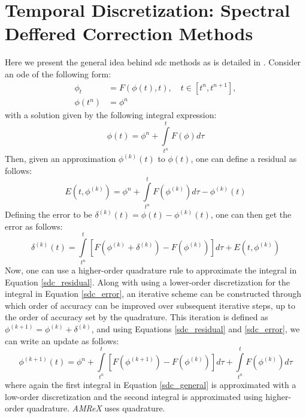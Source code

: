 \section{Temporal Discretization: Spectral Deffered Correction Methods}
Here we present the general idea behind \gls{sdc} methods as is detailed in \cite{MISDC_general}. Consider an \gls{ode} of the following form: 
\begin{equation} \label{toy_ode}
\begin{split}
\phi_t &= F(\phi(t), t), \quad t \in [t^n, t^{n+1}], \\
\phi(t^n) &= \phi^n 
\end{split}
\end{equation}
with a solution given by the following integral expression:
\begin{equation}
\phi(t) = \phi^n + \int\limits_{t^n}^{t} F(\phi) d\tau
\end{equation}
Then, given an approximation $\phi^{(k)}(t)$ to $\phi(t)$, one can define a residual as follows:
\begin{equation} \label{sdc_residual}
E(t, \phi^{(k)}) = \phi^n + \int\limits_{t^n}^t  F(\phi^{(k)}) d\tau - \phi^{(k)}(t)
\end{equation}
Defining the error to be $\delta^{(k)}(t) = \phi(t) - \phi^{(k)}(t)$, one can then get the error as follows:
\begin{equation} \label{sdc_error}
\delta^{(k)}(t) = \int\limits_{t^n}^{t} \left[ F(\phi^{(k)} + \delta^{(k)}) - F(\phi^{(k)}) \right] d\tau + E(t, \phi^{(k)})
\end{equation}
Now, one can use a higher-order quadrature rule to approximate the integral in Equation \eqref{sdc_residual}. Along with using a lower-order discretization for the integral in Equation \eqref{sdc_error}, an iterative scheme can be constructed through which order of accuracy can be improved over subsequent iterative steps, up to the order of accuracy set by the quadrature. This iteration is defined as $\phi^{(k+1)} = \phi^{(k)} + \delta^{(k)}$, and using Equations \eqref{sdc_residual} and \eqref{sdc_error}, we can write an update as follows:
\begin{equation} \label{sdc_general}
\phi^{(k+1)}(t) = \phi^n + \int\limits_{t^n}^{t} \left[ F(\phi^{(k+1)}) - F(\phi^{(k)}) \right] d\tau + \int\limits_{t^n}^{t}F(\phi^{(k)}) d\tau
\end{equation}
where again the first integral in Equation \eqref{sdc_general} is approximated with a low-order discretization and the second integral is approximated using higher-order quadrature. \textit{AMReX} uses quadrature. 


